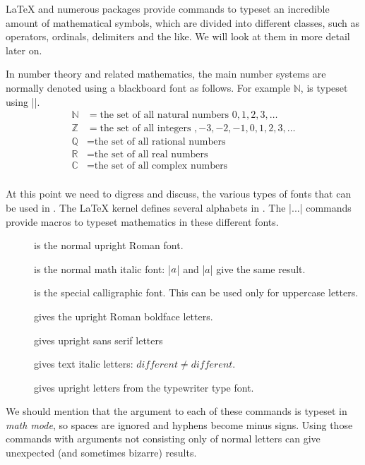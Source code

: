 LaTeX and numerous packages provide commands to typeset an incredible amount of mathematical symbols, which are divided into different classes, such as operators, ordinals, delimiters and the like. We will look at them in more detail later on.

In number theory and related mathematics, the main number systems are normally denoted using a blackboard font as follows. For example $\mathbb{N}$, is typeset using ||.
\begin{align*}
\mathbb{N} & = \text{the set of all natural numbers }0,1,2,3,\dots \\
\mathbb{Z} & = \text{the set of all integers }, -3,-2,-1,0,1,2,3,\dots\\
\mathbb{Q} & = \text{the set of all rational numbers}\\
\mathbb{R} & = \text{the set of all real numbers}\\
\mathbb{C} & = \text{the set of all complex numbers}\\
\end{align*}


At this point we need to digress and discuss, the various types of fonts that can be used in \latex. The LaTeX kernel defines several alphabets in . The |\math...| commands provide macros to typeset mathematics in these different fonts.
\begin{description}
\item[] is the normal upright Roman font.
\item[] is the normal math italic font: |$\mathnormal{a}$| and |$a$| give the same result.
\item[] is the special calligraphic font. This can be used only for uppercase letters.
\item[] gives the upright Roman boldface letters.
\item[] gives upright sans serif letters
\item[] gives text italic letters: $different\ne\mathit{different}.$
\item[] gives upright letters from the typewriter type font.
\end{description} 

We should mention that the argument to each of these commands is typeset in \emph{math mode}, so spaces are ignored and hyphens become minus signs. Using those commands with arguments not consisting only of normal letters can give unexpected (and sometimes bizarre) results.

